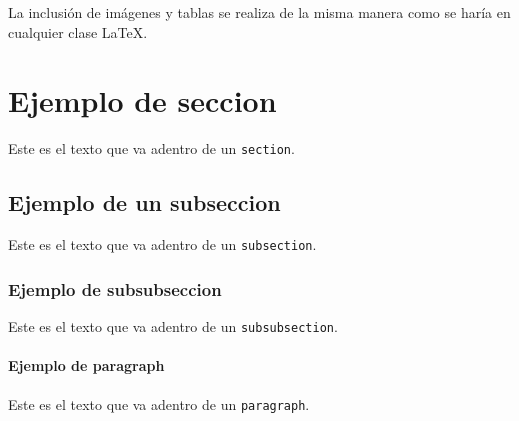 \documentclass[]{UPN}
\begin{document}
La inclusión de imágenes y tablas se realiza de la misma manera como se haría en cualquier clase \LaTeX.

\section{Ejemplo de seccion} \label{Ejemplo_seccion}
Este es el texto que va adentro de un {\tt section}.
\subsection{Ejemplo de un subseccion}
Este es el texto que va adentro de un {\tt subsection}.
\subsubsection{Ejemplo de subsubseccion}
Este es el texto que va adentro de un {\tt subsubsection}.
\paragraph{Ejemplo de paragraph}
Este es el texto que va adentro de un {\tt paragraph}.
\end{document}
